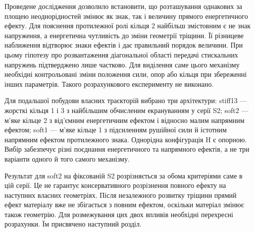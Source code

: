 Проведене дослідження дозволило встановити, що розташування однакових за площею неоднорідностей змінює як знак, так і величину прямого енергетичного ефекту. Для пояснення протилежної ролі кільця 2 найбільш змістовним є не знак напруження, а енергетична чутливість до зміни геометрії тріщини. Її різницеве наближення відтворює знаки ефектів і дає правильний порядок величини. При цьому гіпотезу про розвантаження діагональної області передачі стискальних напружень підтверджено лише частково. Для виділення саме цього механізму необхідні контрольовані зміни положення сили, опор або кільця при збереженні інших параметрів. Такого розрахункового експерименту не виконано.

Для подальшої побудови власних траєкторій вибрано три архітектури: stiff13 --- жорсткі кільця 1 і 3 з найбільшим обчисленим екрануванням у серії S2; soft2 --- м'яке кільце 2 з від'ємним енергетичним ефектом і відносно малим напрямним ефектом; soft1 --- м'яке кільце 1 з підсиленням рушійної сили й істотним напрямним ефектом протилежного знака. Однорідна конфігурація H є опорною. Вибір забезпечує різні поєднання енергетичного та напрямного ефектів, а не три варіанти одного й того самого механізму.

Результат для soft2 на фіксованій S2 розрізняється за обома критеріями саме в цій серії. Це не гарантує консервативного розрізнення повного ефекту на наступних власних геометріях. Після незалежного розвитку тріщини прямий ефект матеріалу вже не збігається з повним ефектом, оскільки матеріал змінює також геометрію. Для розмежування цих двох впливів необхідні перехресні розрахунки. Їм присвячено наступний розділ.
